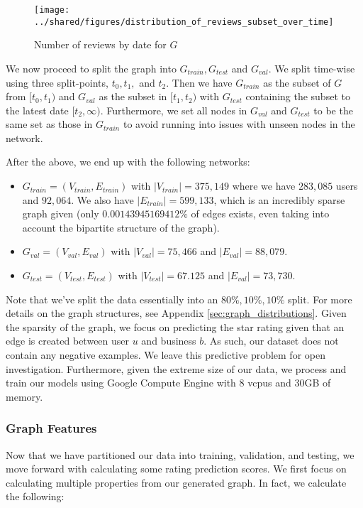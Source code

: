 \documentclass[letterpaper, 10 pt, conference]{ieeeconf}  %
\begin{document}
\begin{figure}[h!]
\centering
\texttt{[image: ../shared/figures/distribution\_of\_reviews\_subset\_over\_time]}
\caption{Number of reviews by date for $G$}
\label{fig:reviews_subset_over_time}
\end{figure}

We now proceed to split the graph into $G_{train}, G_{test}$ and $G_{val}$. We split time-wise using three split-points, $t_0, t_1,$ and $t_2$. Then we have $G_{train}$ as the subset of $G$ from $[t_0, t_1)$ and $G_{val}$ as the subset in $[t_1, t_2)$ with $G_{test}$ containing the subset to the latest date $[t_2, \infty)$. Furthermore, we set all nodes in $G_{val}$ and $G_{test}$ to be the same set as those in $G_{train}$ to avoid running into issues with unseen nodes in the network.

After the above, we end up with the following networks:
\begin{itemize}
\item $G_{train} = (V_{train}, E_{train})$ with $|V_{train}| = 375,149$ where we have $283,085$ users and $92,064$. We also have $|E_{train}| = 599,133$, which is an incredibly sparse graph given (only $0.00143945169412\%$ of edges exists, even taking into account the bipartite structure of the graph).
\item $G_{val} = (V_{val}, E_{val})$ with $|V_{val}| = 75,466$ and $|E_{val}| = 88,079$.
\item $G_{test} = (V_{test}, E_{test})$ with $|V_{test}| = 67.125$ and $|E_{val}| = 73,730$.
\end{itemize}

Note that we've split the data essentially into an $80\%, 10\%, 10\%$ split. For more details on the graph structures, see Appendix \ref{sec:graph_distributions}. Given the sparsity of the graph, we focus on predicting the star rating given that an edge is created between user $u$ and business $b$. As such, our dataset does not contain any negative examples. We leave this predictive problem for open investigation. Furthermore, given the extreme size of our data, we process and train our models using Google Compute Engine with 8 vcpus and 30GB of memory.

\subsubsection{Graph Features}
Now that we have partitioned our data into training, validation, and testing, we move forward with calculating some rating prediction scores. We first focus on calculating multiple properties from our generated graph. In fact, we calculate the following:
\end{document}
